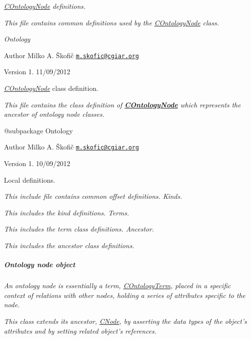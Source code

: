 {\itshape \hyperlink{class_c_ontology_node}{C\-Ontology\-Node} definitions.}

{\itshape This file contains common definitions used by the \hyperlink{class_c_ontology_node}{C\-Ontology\-Node} class.}

{\itshape  Ontology}

{\itshape \begin{DoxyAuthor}{Author}
Milko A. Škofič \href{mailto:m.skofic@cgiar.org}{\tt m.\-skofic@cgiar.\-org} 
\end{DoxyAuthor}
\begin{DoxyVersion}{Version}
1. 11/09/2012
\end{DoxyVersion}
{\itshape \hyperlink{class_c_ontology_node}{C\-Ontology\-Node}} class definition.}

{\itshape This file contains the class definition of {\bfseries \hyperlink{class_c_ontology_node}{C\-Ontology\-Node}} which represents the ancestor of ontology node classes.}

{\itshape \begin{DoxyVerb} @subpackage        Ontology
\end{DoxyVerb}
}

{\itshape \begin{DoxyAuthor}{Author}
Milko A. Škofič \href{mailto:m.skofic@cgiar.org}{\tt m.\-skofic@cgiar.\-org} 
\end{DoxyAuthor}
\begin{DoxyVersion}{Version}
1. 10/09/2012
\end{DoxyVersion}
Local definitions.}

{\itshape This include file contains common offset definitions. Kinds.}

{\itshape This includes the kind definitions. Terms.}

{\itshape This includes the term class definitions. Ancestor.}

{\itshape This includes the ancestor class definitions. \subparagraph*{Ontology node object}}

{\itshape }

{\itshape An ontology node is essentially a term, \hyperlink{class_c_ontology_term}{C\-Ontology\-Term}, placed in a specific context of relations with other nodes, holding a series of attributes specific to the node.}

{\itshape This class extends its ancestor, \hyperlink{class_c_node}{C\-Node}, by asserting the data types of the object's attributes and by setting related object's references.}


